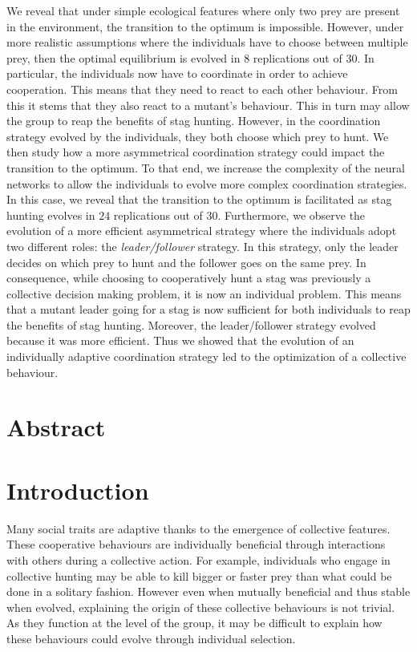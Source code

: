 We reveal that under simple ecological features where only two prey are present in the environment, the transition to the optimum is impossible. However, under more realistic assumptions where the individuals have to choose between multiple prey, then the optimal equilibrium is evolved in $8$ replications out of $30$. In particular, the individuals now have to coordinate in order to achieve cooperation. This means that they need to react to each other behaviour. From this it stems that they also react to a mutant's behaviour. This in turn may allow the group to reap the benefits of stag hunting. 
However, in the coordination strategy evolved by the individuals, they both choose which prey to hunt. We then study how a more asymmetrical coordination strategy could impact the transition to the optimum. To that end, we increase the complexity of the neural networks to allow the individuals to evolve more complex coordination strategies. In this case, we reveal that the transition to the optimum is facilitated as stag hunting evolves in $24$ replications out of $30$. Furthermore, we observe the evolution of a more efficient asymmetrical strategy where the individuals adopt two different roles: the \emph{leader/follower} strategy. In this strategy, only the leader decides on which prey to hunt and the follower goes on the same prey. In consequence, while choosing to cooperatively hunt a stag was previously a collective decision making problem, it is now an individual problem. This means that a mutant leader going for a stag is now sufficient for both individuals to reap the benefits of stag hunting. Moreover, the leader/follower strategy evolved because it was more efficient. Thus we showed that the evolution of an individually adaptive coordination strategy led to the optimization of a collective behaviour.

\clearpage



\section{Abstract}


\section{Introduction}
  Many social traits are adaptive thanks to the emergence of collective features. These cooperative behaviours are individually beneficial through interactions with others during a collective action. For example, individuals who engage in collective hunting may be able to kill bigger or faster prey than what could be done in a solitary fashion. However even when mutually beneficial and thus stable when evolved, explaining the origin of these collective behaviours is not trivial. As they function at the level of the group, it may be difficult to explain how these behaviours could evolve through individual selection.

